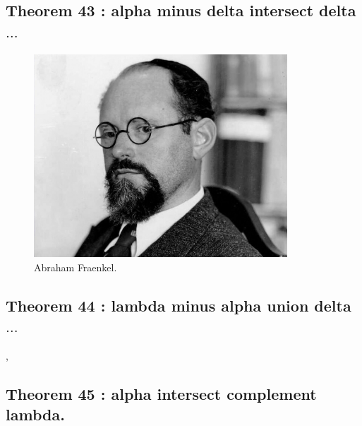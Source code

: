 \documentclass[preview]{standalone}
\begin{document}
\subsection[Alpha minus delta intersect delta $\dots$]
    {
        \color{section}Theorem 43 \color{black} : alpha minus delta intersect delta $\dots$
    }

\vspace{2\baselineskip}
\begin{figure}[!h]
    \centering
    \includegraphics[width=9.5cm]{../resources/jpg/2.2.set.operations/fraenkel.jpg}
    \caption*{Abraham Fraenkel.}
\end{figure}
\pagebreak


\subsection[Lambda minus alpha union delta $\dots$]
    {
        \color{section}Theorem 44 \color{black} : lambda minus alpha union delta $\dots$
    }

\sep
\vspace{0.5\baselineskip}


\subsection[Alpha intersect complement lambda.]
    {
        \color{section}Theorem 45 \color{black} : alpha intersect complement lambda.
    }

\pagebreak


\end{document}
